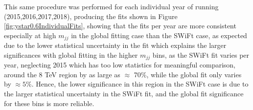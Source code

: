 This same procedure was performed for each individual year of running (2015,2016,2017,2018), producing the fits shown in Figure \ref{fig:ystar0.6IndividualFits}, showing that the fits per year are more consistent especially at high $m_{jj}$ in the global fitting case than the SWiFt case, as expected due to the lower statistical uncertainty in the fit which explains the larger significances with global fitting in the higher $m_{jj}$ bins, as the SWiFt fit varies per year, neglecting 2015 which has too low statistics for meaningful comparison, around the 8 TeV region by as large as $\approx$ 70\%, while the global fit only varies by $\approx 5\%$. Hence, the lower significance in this region in the SWiFt case is due to the larger statistical uncertainty in the SWiFt fit, and the global fit significance for these bins is more reliable.


